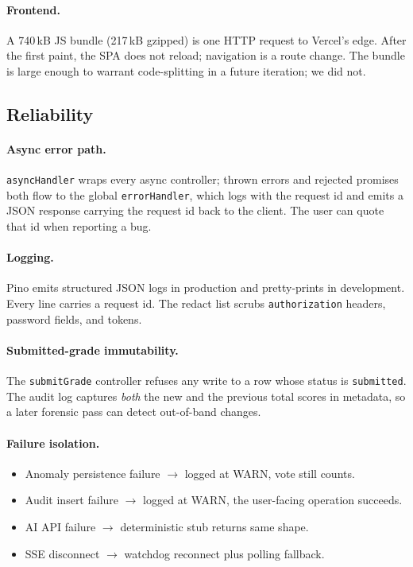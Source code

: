 \paragraph{Frontend.} A 740\,kB JS bundle (217\,kB gzipped) is one HTTP
request to Vercel's edge. After the first paint, the SPA does not
reload; navigation is a route change. The bundle is large enough to
warrant code-splitting in a future iteration; we did not.

\subsection{Reliability}

\paragraph{Async error path.} \texttt{asyncHandler} wraps every async
controller; thrown errors and rejected promises both flow to the global
\texttt{errorHandler}, which logs with the request id and emits a JSON
response carrying the request id back to the client. The user can quote
that id when reporting a bug.

\paragraph{Logging.} Pino emits structured JSON logs in production and
pretty-prints in development. Every line carries a request id. The redact
list scrubs \texttt{authorization} headers, password fields, and tokens.

\paragraph{Submitted-grade immutability.} The \texttt{submitGrade}
controller refuses any write to a row whose status is
\texttt{submitted}. The audit log captures \emph{both} the new and the
previous total scores in metadata, so a later forensic pass can detect
out-of-band changes.

\paragraph{Failure isolation.}
\begin{itemize}[leftmargin=*]
  \item Anomaly persistence failure $\to$ logged at WARN, vote still counts.
  \item Audit insert failure $\to$ logged at WARN, the user-facing
        operation succeeds.
  \item AI API failure $\to$ deterministic stub returns same shape.
  \item SSE disconnect $\to$ watchdog reconnect plus polling fallback.
\end{itemize}

